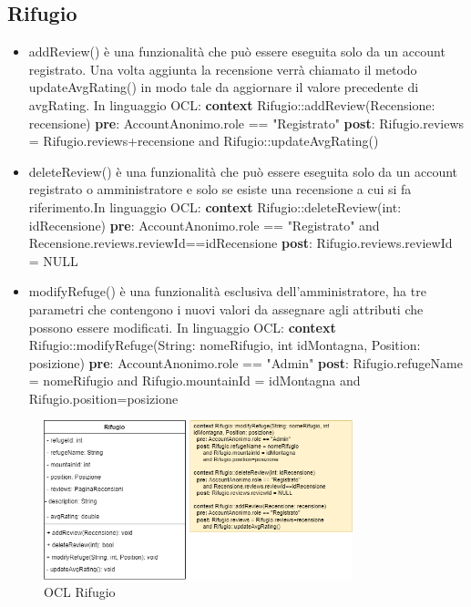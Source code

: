 \documentclass[a4paper,12pt]{article}
\begin{document}
\subsection{Rifugio}
\begin{itemize}
    \item addReview() è una funzionalità che può essere eseguita solo da un account registrato. Una volta aggiunta la recensione verrà chiamato il metodo updateAvgRating() in modo tale da aggiornare il valore precedente di avgRating. \newline \newline In linguaggio OCL:\newline
    \textbf{context} Rifugio::addReview(Recensione: recensione) \newline 
    \textbf{pre}: AccountAnonimo.role == "Registrato"\newline
    \textbf{post}: Rifugio.reviews = Rifugio.reviews+recensione and Rifugio::updateAvgRating() 
    \item deleteReview() è una funzionalità che può essere eseguita solo da un account registrato o amministratore e solo se esiste una recensione a cui si fa riferimento.\newline \newline In linguaggio OCL:\newline
    \textbf{context} Rifugio::deleteReview(int: idRecensione) \newline
    \textbf{pre}: AccountAnonimo.role == "Registrato" \newline 
    and Recensione.reviews.reviewId==idRecensione \newline
    \textbf{post}: Rifugio.reviews.reviewId = NULL  
    \item modifyRefuge() è una funzionalità esclusiva dell'amministratore, ha tre parametri che contengono i nuovi valori da assegnare agli attributi che possono essere modificati. \newline \newline In linguaggio OCL:\newline
    \textbf{context} Rifugio::modifyRefuge(String: nomeRifugio, int idMontagna, Position: posizione) \newline
    \textbf{pre}: AccountAnonimo.role == "Admin" \newline
    \textbf{post}: Rifugio.refugeName = nomeRifugio and Rifugio.mountainId = idMontagna and Rifugio.position=posizione 
\end{itemize}

\begin{figure}[H]
   \centering
   \includegraphics[width=0.8\textwidth] {D3/img/rifugio_OCL.png}
    \caption{OCL Rifugio}
\end{figure}
\end{document}
